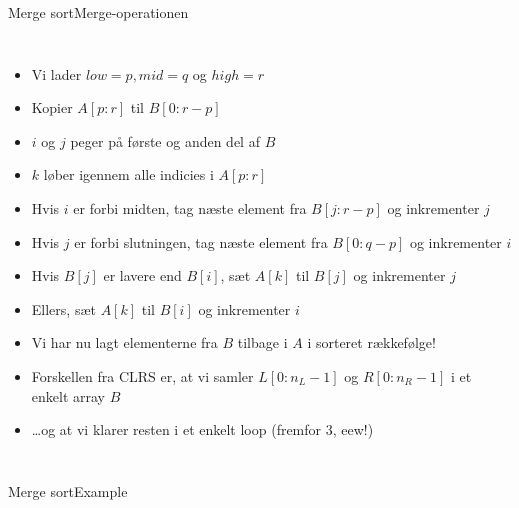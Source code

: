 \documentclass{beamer}
\begin{document}
\begin{frame}{Merge sort}{Merge-operationen}
\begin{columns}
        \begin{itemize}[<+->]
            \scriptsize
            \item Vi lader $low = p, mid = q$ og $high = r$
            \item Kopier $A[p:r]$ til $B[0:r-p]$
            \item $i$ og $j$ peger på første og anden del af $B$
            \item $k$ løber igennem alle indicies i $A[p:r]$
            \item Hvis $i$ er forbi midten, tag næste element fra $B[j:r-p]$ og
                inkrementer $j$
            \item Hvis $j$ er forbi slutningen, tag næste element fra $B[0:q-p]$
                og inkrementer $i$
            \item Hvis $B[j]$ er lavere end $B[i]$, sæt $A[k]$ til $B[j]$ og
                inkrementer $j$
            \item Ellers, sæt $A[k]$ til $B[i]$ og inkrementer $i$
            \item Vi har nu lagt elementerne fra $B$ tilbage i $A$ i sorteret
                rækkefølge!
            \item Forskellen fra CLRS er, at vi samler $L[0:n_L-1]$ og
                $R[0:n_R-1]$ i et enkelt array $B$
            \item \ldots og at vi klarer resten i et enkelt loop (fremfor 3,
                eew!)
        \end{itemize}
    \end{columns}

\end{frame}

\begin{frame}{Merge sort}{Example}




\end{frame}
\end{document}
